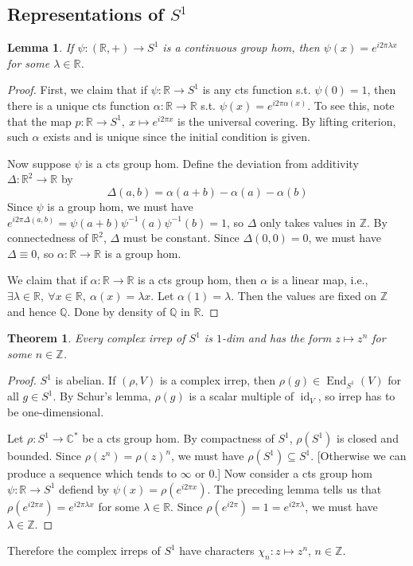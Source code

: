 \documentclass{article}
\theoremstyle{definition}
\theoremstyle{remark}
\theoremstyle{plain}
\newtheorem{lem}[defn]{Lemma}
\newtheorem{thm}[defn]{Theorem}
\newcommand{\ZZ}{\mathbb{Z}}
\newcommand{\QQ}{\mathbb{Q}}
\newcommand{\RR}{\mathbb{R}}
\newcommand{\CC}{\mathbb{C}}
\newcommand{\id}{\operatorname{id}}
\begin{document}
\subsection{Representations of $S^1$}
\begin{lem}
    If $\psi:(\RR,+)\to S^1$ is a continuous group hom, then $\psi(x)=e^{i2\pi\lambda x}$ for some $\lambda\in\RR$.
\end{lem}
\begin{proof}
    First, we claim that if $\psi:\RR\to S^1$ is any cts function s.t. $\psi(0)=1$, then there is a unique cts function $\alpha:\RR\to\RR$ s.t. $\psi(x)=e^{i2\pi\alpha(x)}$. To see this, note that the map $p:\RR\to S^1,\ x\mapsto e^{i2\pi x}$ is the universal covering. By lifting criterion, such $\alpha$ exists and is unique since the initial condition is given.

    Now suppose $\psi$ is a cts group hom. Define the deviation from additivity $\Delta:\RR^2\to\RR$ by \[\Delta(a,b)=\alpha(a+b)-\alpha(a)-\alpha(b)\] Since $\psi$ is a group hom, we must have $e^{i2\pi\Delta(a,b)}=\psi(a+b)\psi^{-1}(a)\psi^{-1}(b)=1$, so $\Delta$ only takes values in $\ZZ$. By connectedness of $\RR^2$, $\Delta$ must be constant. Since $\Delta(0,0)=0$, we must have $\Delta\equiv 0$, so $\alpha:\RR\to\RR$ is a group hom.

    We claim that if $\alpha:\RR\to \RR$ is a cts group hom, then $\alpha$ is a linear map, i.e., $\exists\lambda\in\RR,\ \forall x\in\RR,\ \alpha(x)=\lambda x$. Let $\alpha(1)=\lambda$. Then the values are fixed on $\ZZ$ and hence $\QQ$. Done by density of $\QQ$ in $\RR$.
\end{proof}

\begin{thm}
    Every complex irrep of $S^1$ is $1$-dim and has the form $z\mapsto z^n$ for some $n\in\ZZ$.
\end{thm}
\begin{proof}
    $S^1$ is abelian. If $(\rho, V)$ is a complex irrep, then $\rho(g)\in\operatorname{End}_{S^1}(V)$ for all $g\in S^1$. By Schur's lemma, $\rho(g)$ is a scalar multiple of $\id_V$, so irrep has to be one-dimensional.

    Let $\rho:S^1\to \CC^\ast$ be a cts group hom. By compactness of $S^1$, $\rho(S^1)$ is closed and bounded. Since $\rho(z^n)=\rho(z)^n$, we must have $\rho(S^1)\subseteq S^1$. [Otherwise we can produce a sequence which tends to $\infty$ or $0$.] Now consider a cts group hom $\psi:\RR\to S^1$ defiend by $\psi(x)=\rho(e^{i2\pi x})$. The preceding lemma tells us that $\rho(e^{i2\pi x})=e^{i2\pi \lambda x}$ for some $\lambda\in\RR$. Since $\rho(e^{i2\pi })=1=e^{i2\pi\lambda}$, we must have $\lambda\in\ZZ$.
\end{proof}
Therefore the complex irreps of $S^1$ have characters $\chi_n:z\mapsto z^n$, $n\in\ZZ$.
\end{document}

